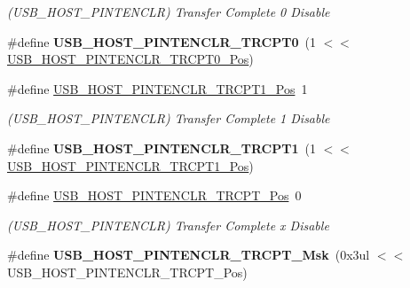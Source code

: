 \begin{DoxyCompactItemize}
\begin{DoxyCompactList}\small\item\em (U\+S\+B\+\_\+\+H\+O\+S\+T\+\_\+\+P\+I\+N\+T\+E\+N\+C\+L\+R) Transfer Complete 0 Disable \end{DoxyCompactList}\item 
\hypertarget{group___s_a_m_l21___u_s_b_ga96c6f3e4b651d4a5baea8e9f525a334c}{}\#define {\bfseries U\+S\+B\+\_\+\+H\+O\+S\+T\+\_\+\+P\+I\+N\+T\+E\+N\+C\+L\+R\+\_\+\+T\+R\+C\+P\+T0}~(1 $<$$<$ \hyperlink{group___s_a_m_l21___u_s_b_gafac89e47191cfdf2ffe2e994a2ff5924}{U\+S\+B\+\_\+\+H\+O\+S\+T\+\_\+\+P\+I\+N\+T\+E\+N\+C\+L\+R\+\_\+\+T\+R\+C\+P\+T0\+\_\+\+Pos})\label{group___s_a_m_l21___u_s_b_ga96c6f3e4b651d4a5baea8e9f525a334c}

\item 
\hypertarget{group___s_a_m_l21___u_s_b_ga2b884329a98d8cd20e96bbe8ff2b8bde}{}\#define \hyperlink{group___s_a_m_l21___u_s_b_ga2b884329a98d8cd20e96bbe8ff2b8bde}{U\+S\+B\+\_\+\+H\+O\+S\+T\+\_\+\+P\+I\+N\+T\+E\+N\+C\+L\+R\+\_\+\+T\+R\+C\+P\+T1\+\_\+\+Pos}~1\label{group___s_a_m_l21___u_s_b_ga2b884329a98d8cd20e96bbe8ff2b8bde}

\begin{DoxyCompactList}\small\item\em (U\+S\+B\+\_\+\+H\+O\+S\+T\+\_\+\+P\+I\+N\+T\+E\+N\+C\+L\+R) Transfer Complete 1 Disable \end{DoxyCompactList}\item 
\hypertarget{group___s_a_m_l21___u_s_b_ga1f82b2c4b82b3547f5d223b9eb2412f2}{}\#define {\bfseries U\+S\+B\+\_\+\+H\+O\+S\+T\+\_\+\+P\+I\+N\+T\+E\+N\+C\+L\+R\+\_\+\+T\+R\+C\+P\+T1}~(1 $<$$<$ \hyperlink{group___s_a_m_l21___u_s_b_ga2b884329a98d8cd20e96bbe8ff2b8bde}{U\+S\+B\+\_\+\+H\+O\+S\+T\+\_\+\+P\+I\+N\+T\+E\+N\+C\+L\+R\+\_\+\+T\+R\+C\+P\+T1\+\_\+\+Pos})\label{group___s_a_m_l21___u_s_b_ga1f82b2c4b82b3547f5d223b9eb2412f2}

\item 
\hypertarget{group___s_a_m_l21___u_s_b_gaac8d2314c05e22f66ed87241531e7b5f}{}\#define \hyperlink{group___s_a_m_l21___u_s_b_gaac8d2314c05e22f66ed87241531e7b5f}{U\+S\+B\+\_\+\+H\+O\+S\+T\+\_\+\+P\+I\+N\+T\+E\+N\+C\+L\+R\+\_\+\+T\+R\+C\+P\+T\+\_\+\+Pos}~0\label{group___s_a_m_l21___u_s_b_gaac8d2314c05e22f66ed87241531e7b5f}

\begin{DoxyCompactList}\small\item\em (U\+S\+B\+\_\+\+H\+O\+S\+T\+\_\+\+P\+I\+N\+T\+E\+N\+C\+L\+R) Transfer Complete x Disable \end{DoxyCompactList}\item 
\hypertarget{group___s_a_m_l21___u_s_b_gafc75aeda73dcab0de41462bb38bc8893}{}\#define {\bfseries U\+S\+B\+\_\+\+H\+O\+S\+T\+\_\+\+P\+I\+N\+T\+E\+N\+C\+L\+R\+\_\+\+T\+R\+C\+P\+T\+\_\+\+Msk}~(0x3ul $<$$<$ U\+S\+B\+\_\+\+H\+O\+S\+T\+\_\+\+P\+I\+N\+T\+E\+N\+C\+L\+R\+\_\+\+T\+R\+C\+P\+T\+\_\+\+Pos)\label{group___s_a_m_l21___u_s_b_gafc75aeda73dcab0de41462bb38bc8893}


\end{DoxyCompactItemize}
